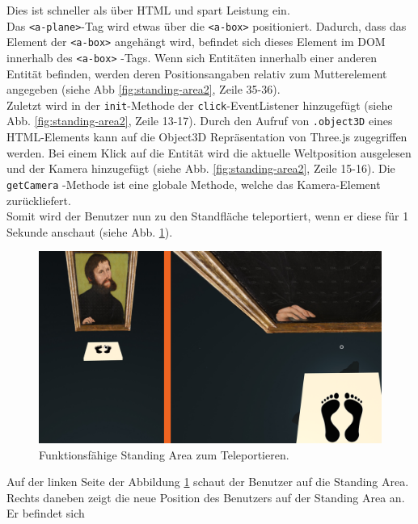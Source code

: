 \documentclass[a4paper,12pt,oneside]{article}
\begin{document}
        Dies ist schneller als über HTML und spart Leistung ein. \\
        Das \texttt{<a-plane>}-Tag wird etwas über die \texttt{<a-box>}
        positioniert. Dadurch, dass das Element der \texttt{<a-box>} angehängt
        wird, befindet sich dieses Element im DOM innerhalb des \texttt{<a-box>}
        -Tags. Wenn sich Entitäten innerhalb einer anderen Entität befinden,
        werden deren Positionsangaben relativ zum Mutterelement angegeben
        (siehe Abb \ref{fig:standing-area2}, Zeile 35-36). \\
        Zuletzt wird in der \texttt{init}-Methode der \texttt{click}-EventListener
        hinzugefügt (siehe Abb. \ref{fig:standing-area2}, Zeile 13-17).
        Durch den Aufruf von \texttt{.object3D} eines HTML-Elements kann
        auf die Object3D Repräsentation von Three.js zugegriffen werden.
        Bei einem Klick auf die Entität wird die aktuelle Weltposition
        ausgelesen und der Kamera hinzugefügt 
        (siehe Abb. \ref{fig:standing-area2}, Zeile 15-16). Die \texttt{getCamera}
        -Methode ist eine globale Methode, welche das Kamera-Element 
        zurückliefert. \\
        Somit wird der Benutzer nun zu den Standfläche teleportiert, wenn
        er diese für 1 Sekunde anschaut 
        (siehe Abb. \ref{fig:standing-area3}).
        \begin{figure}[h]
          \centering
          \includegraphics[scale=0.3]{img/coding/standing-area3.png}
          \caption{Funktionsfähige Standing Area zum Teleportieren.}
          \label{fig:standing-area3}
        \end{figure}
        Auf der linken Seite der Abbildung \ref{fig:standing-area3} schaut
        der Benutzer auf die Standing Area. Rechts daneben zeigt die neue
        Position des Benutzers auf der Standing Area an. Er befindet sich
\end{document}
